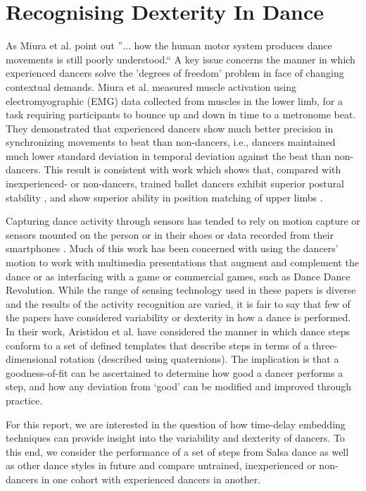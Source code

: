 \documentclass[10pt,journal,compsoc]{IEEEtran}
\begin{document}
\section{Recognising Dexterity In Dance }
As Miura et al. \cite{Miura2015} point out ''$\ldots$ how the human motor system produces 
dance movements is still poorly understood.`` A key issue concerns the manner in which experienced 
dancers solve the 'degrees of freedom' problem in face of changing contextual demands.  
Miura et al. \cite{Miura2013} measured muscle activation using electromyographic (EMG) data collected 
from muscles in the lower limb, for a task requiring participants to 
bounce up and down in time to a metronome beat.  
They demonstrated that experienced dancers show much better precision in synchronizing 
movements to beat than non-dancers, i.e., dancers maintained much lower standard 
deviation in temporal deviation against the beat than non-dancers. 
This result is consistent with work which shows that, compared with inexperienced- or 
non-dancers, trained ballet dancers exhibit superior postural 
stability \cite{Crotts1996}, and show superior ability in position matching 
of upper limbs \cite{Ramsay2001}.

Capturing dance activity through sensors has tended to rely on motion capture 
\cite{Alexiadis2014} or sensors mounted on the person \cite{Lynch2005} 
or in their shoes \cite{Paradiso1997} or data recorded from their smartphones \cite{Wei2014}.
Much of this work has been concerned with using the dancers' motion to work with 
multimedia presentations that augment and complement the dance \cite{Griffith1998, Park2006}
or as interfacing with a game \cite{Chu2012} or commercial games, such as Dance Dance Revolution.  
While the range of sensing technology used in these papers is diverse and the results 
of the activity recognition are varied, it is fair to say that few of the papers have considered 
variability or dexterity in how a dance is performed. 
In their work, Aristidou et al. \cite{Aristidou2014}
have considered the manner in which dance steps conform to a set of defined 
templates that describe steps in terms of a three-dimensional rotation (described using quaternions).  
The implication is that a goodness-of-fit can be ascertained to determine how good a dancer 
performs a step, and how any deviation from ‘good’ can be modified and improved through practice. 

For this report, we are interested in the question of how time-delay embedding techniques 
can provide insight into the variability and dexterity of dancers. 
To this end, we consider the performance of a set of steps from Salsa dance 
as well as other dance styles in future and 
compare untrained, inexperienced or non-dancers in one cohort with experienced dancers in another.
\end{document}

